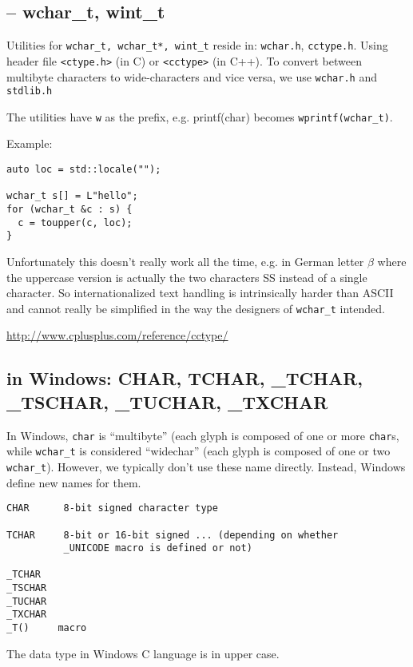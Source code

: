 \subsection{-- wchar\_t, wint\_t}

Utilities for \verb!wchar_t, wchar_t*, wint_t! reside in: \verb!wchar.h!,
\verb!cctype.h!. Using header file \verb!<ctype.h>! (in C) or \verb!<cctype>!
(in C++).  To convert between multibyte characters to wide-characters and vice versa, we
use \verb!wchar.h! and \verb!stdlib.h!

The utilities have \verb!w! as the prefix, e.g. printf(char) becomes
\verb!wprintf(wchar_t)!.

Example:
\begin{lstlisting}
auto loc = std::locale("");

wchar_t s[] = L"hello";
for (wchar_t &c : s) {
  c = toupper(c, loc);
}
\end{lstlisting}

Unfortunately this doesn't really work all the time, e.g. 
in German letter $\beta$ where the uppercase version is actually the two
characters SS instead of a single character.
So internationalized text handling is intrinsically harder than ASCII and cannot
really be simplified in the way the designers of \verb!wchar_t! intended.

\url{http://www.cplusplus.com/reference/cctype/}

\subsection{in Windows: CHAR, TCHAR, \_TCHAR, \_TSCHAR, \_TUCHAR, \_TXCHAR}

In Windows, \verb!char! is ``multibyte'' (each glyph is composed of one or more
\verb!char!s, while \verb!wchar_t! is considered ``widechar'' (each glyph is
composed of one or two \verb!wchar_t!). However, we typically don't use these
name directly. Instead, Windows define new names for them. 


\begin{verbatim}
CHAR      8-bit signed character type

TCHAR     8-bit or 16-bit signed ... (depending on whether 
          _UNICODE macro is defined or not)
          
_TCHAR
_TSCHAR
_TUCHAR
_TXCHAR
_T()     macro

\end{verbatim}
The data type in Windows C language is in upper case.

